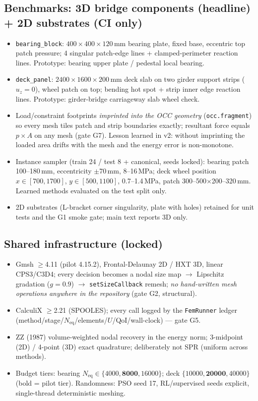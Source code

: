 \documentclass[preprint,12pt]{elsarticle}
\newcommand{\Neq}{N_{\mathrm{eq}}}
\newenvironment{plan}{\begin{itemize}\setlength\itemsep{0.15em}}{\end{itemize}}
\begin{document}
\subsection{Benchmarks: 3D bridge components (headline) + 2D substrates (CI only)}
\begin{plan}
  \item \texttt{bearing\_block}: $400\times400\times120$\,mm bearing plate, fixed base,
        eccentric top patch pressure; 4 singular patch-edge lines + clamped-perimeter
        reaction lines. Prototype: bearing upper plate / pedestal local bearing.
  \item \texttt{deck\_panel}: $2400\times1600\times200$\,mm deck slab on two girder
        support strips ($u_z=0$), wheel patch on top; bending hot spot + strip inner
        edge reaction lines. Prototype: girder-bridge carriageway slab wheel check.
  \item Load/constraint footprints \emph{imprinted into the OCC geometry}
        (\texttt{occ.fragment}) so every mesh tiles patch and strip boundaries exactly;
        resultant force equals $p\times A$ on any mesh (gate G7). Lesson learned in
        v2: without imprinting the loaded area drifts with the mesh and the energy
        error is non-monotone.
  \item Instance sampler (train 24 / test 8 + canonical, seeds locked): bearing patch
        100--180\,mm, eccentricity $\pm$70\,mm, 8--16\,MPa; deck wheel position
        $x\in[700,1700]$, $y\in[500,1100]$, 0.7--1.4\,MPa, patch
        300--500$\times$200--320\,mm. Learned methods evaluated on the test split only.
  \item 2D substrates (L-bracket corner singularity, plate with holes) retained for
        unit tests and the G1 smoke gate; main text reports 3D only.
\end{plan}

\subsection{Shared infrastructure (locked)}
\begin{plan}
  \item Gmsh $\ge$4.11 (pilot 4.15.2), Frontal-Delaunay 2D / HXT 3D, linear CPS3/C3D4;
        every decision becomes a nodal size map $\to$ Lipschitz gradation ($g=0.9$)
        $\to$ \texttt{setSizeCallback} remesh; \emph{no hand-written mesh operations
        anywhere in the repository} (gate G2, structural).
  \item CalculiX $\ge$2.21 (SPOOLES); every call logged by the \texttt{FemRunner}
        ledger (method/stage/$\Neq$/elements/$U$/QoI/wall-clock) --- gate G5.
  \item ZZ (1987) volume-weighted nodal recovery in the energy norm; 3-midpoint (2D) /
        4-point (3D) exact quadrature; deliberately not SPR (uniform across methods).
  \item Budget tiers: bearing $\Neq\in\{4000,\mathbf{8000},16000\}$; deck
        $\{10000,\mathbf{20000},40000\}$ (bold = pilot tier). Randomness: PSO seed 17,
        RL/supervised seeds explicit, single-thread deterministic meshing.
\end{plan}
\end{document}
